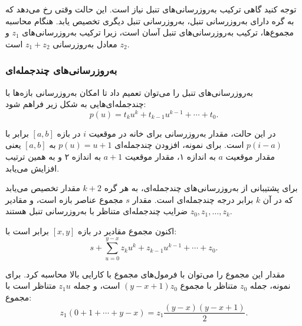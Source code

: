 \begin{center}
\end{center}

توجه کنید گاهی ترکیب به‌روزرسانی‌های تنبل نیاز است.
این حالت وقتی رخ می‌دهد که به گره دارای به‌روزرسانی تنبل، به‌روزرسانی تنبل دیگری تخصیص یابد.
هنگام محاسبه مجموع‌ها، ترکیب به‌روزرسانی‌های تنبل آسان است، زیرا ترکیب به‌روزرسانی‌های $z_1$ و $z_2$ معادل به‌روزرسانی $z_1+z_2$ است.

\subsubsection{به‌روزرسانی‌های چندجمله‌ای}

به‌روزرسانی‌های تنبل را می‌توان تعمیم داد تا امکان به‌روزرسانی بازه‌ها با چندجمله‌ای‌هایی به شکل زیر فراهم شود:
\[p(u) = t_k u^k + t_{k-1} u^{k-1} + \cdots + t_0.\]

در این حالت، مقدار به‌روزرسانی برای خانه در موقعیت $i$ در بازه $[a,b]$ برابر با $p(i-a)$ است.
برای نمونه، افزودن چندجمله‌ای $p(u)=u+1$ به $[a,b]$ یعنی مقدار موقعیت $a$ به اندازه ۱، مقدار موقعیت $a+1$ به اندازه ۲ و به همین ترتیب افزایش می‌یابد.

برای پشتیبانی از به‌روزرسانی‌های چندجمله‌ای، به هر گره $k+2$ مقدار تخصیص می‌یابد که در آن $k$ برابر درجه چندجمله‌ای است.
مقدار $s$ مجموع عناصر بازه است، و مقادیر $z_0,z_1,\ldots,z_k$ ضرایب چندجمله‌ای متناظر با به‌روزرسانی تنبل هستند.

اکنون مجموع مقادیر در بازه $[x,y]$ برابر است با:
\[s+\sum_{u=0}^{y-x} z_k u^k + z_{k-1} u^{k-1} + \cdots + z_0.\]

مقدار این مجموع را می‌توان با فرمول‌های مجموع با کارایی بالا محاسبه کرد.
برای نمونه، جمله $z_0$ متناظر با مجموع $(y-x+1)z_0$ است، و جمله $z_1 u$ متناظر است با مجموع:
\[z_1(0+1+\cdots+y-x) = z_1 \frac{(y-x)(y-x+1)}{2} .\]

